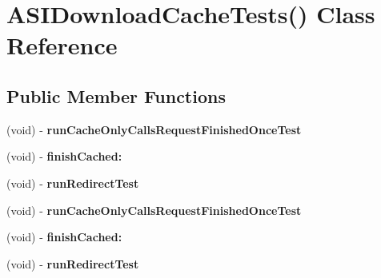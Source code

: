\hypertarget{interface_a_s_i_download_cache_tests_07_08}{
\section{\-A\-S\-I\-Download\-Cache\-Tests() \-Class \-Reference}
\label{interface_a_s_i_download_cache_tests_07_08}
}
\subsection*{\-Public \-Member \-Functions}
\begin{DoxyCompactItemize}
\item 
\hypertarget{interface_a_s_i_download_cache_tests_07_08_aad474ecba9439c09df908bc01d41df5b}{
(void) -\/ {\bfseries run\-Cache\-Only\-Calls\-Request\-Finished\-Once\-Test}}
\label{interface_a_s_i_download_cache_tests_07_08_aad474ecba9439c09df908bc01d41df5b}

\item 
\hypertarget{interface_a_s_i_download_cache_tests_07_08_a5d06a9be86a6e2fd994899a53c5306c0}{
(void) -\/ {\bfseries finish\-Cached\-:}}
\label{interface_a_s_i_download_cache_tests_07_08_a5d06a9be86a6e2fd994899a53c5306c0}

\item 
\hypertarget{interface_a_s_i_download_cache_tests_07_08_a7f2465bd232577824ffe2b37a06d2fe0}{
(void) -\/ {\bfseries run\-Redirect\-Test}}
\label{interface_a_s_i_download_cache_tests_07_08_a7f2465bd232577824ffe2b37a06d2fe0}

\item 
\hypertarget{interface_a_s_i_download_cache_tests_07_08_aad474ecba9439c09df908bc01d41df5b}{
(void) -\/ {\bfseries run\-Cache\-Only\-Calls\-Request\-Finished\-Once\-Test}}
\label{interface_a_s_i_download_cache_tests_07_08_aad474ecba9439c09df908bc01d41df5b}

\item 
\hypertarget{interface_a_s_i_download_cache_tests_07_08_a5d06a9be86a6e2fd994899a53c5306c0}{
(void) -\/ {\bfseries finish\-Cached\-:}}
\label{interface_a_s_i_download_cache_tests_07_08_a5d06a9be86a6e2fd994899a53c5306c0}

\item 
\hypertarget{interface_a_s_i_download_cache_tests_07_08_a7f2465bd232577824ffe2b37a06d2fe0}{
(void) -\/ {\bfseries run\-Redirect\-Test}}
\label{interface_a_s_i_download_cache_tests_07_08_a7f2465bd232577824ffe2b37a06d2fe0}


\end{DoxyCompactItemize}
